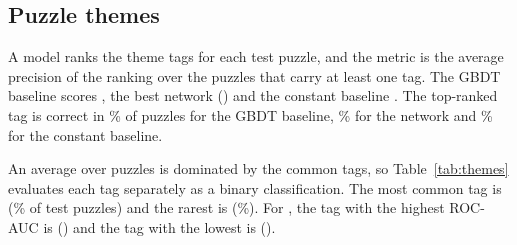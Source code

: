 \documentclass[11pt]{article}
\begin{document}
\subsection{Puzzle themes}

A model ranks the  theme tags for
each test puzzle, and the metric is the average precision of the ranking
over the puzzles that carry at least one tag. The GBDT baseline scores
, the best network
()  and the
constant baseline . The top-ranked tag is
correct in \% of puzzles for the GBDT
baseline, \% for the network and
\% for the constant baseline.

An average over puzzles is dominated by the common tags, so
Table~\ref{tab:themes} evaluates each tag separately as a binary
classification. The most common tag is
(\% of test puzzles) and the rarest
is 
(\%). For
, the tag with the highest ROC-AUC is
() and the tag with the lowest is
().

\begin{table}[htbp]\centering\small
{}
\caption{Puzzle themes: each tag evaluated separately on the test set, most
common first. \emph{Test examples} and \emph{Share} give the number and
percentage of test puzzles that carry the tag. PR-AUC and ROC-AUC measure how
well a model's probability for the tag separates those puzzles from the
rest.}
\label{tab:themes}
\end{table}
\end{document}
